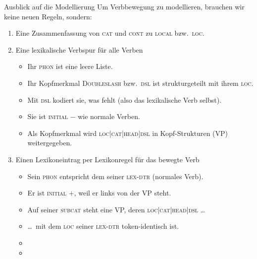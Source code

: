 \begin{frame}
  {Ausblick auf die Modellierung}
  \onslide<+->
  Um \alert{Verbbewegung} zu modellieren, brauchen wir keine neuen Regeln, sondern:\\
  \Halbzeile
  \begin{enumerate}[<+->]
    \item Eine Zusammenfassung von \textsc{cat} und \textsc{cont} zu \alert{\textsc{local}} bzw.\ \alert{\textsc{loc}}.
    \Viertelzeile
    \item Eine \alert{lexikalische Verbspur} für alle Verben
      \begin{itemize}[<+->]
        \item Ihr \textsc{phon} ist eine leere Liste.
        \item Ihr Kopfmerkmal \textsc{Doubleslash} bzw.\ \alert{\textsc{dsl} ist strukturgeteilt mit ihrem \textsc{loc}}.
        \item Mit \textsc{dsl} kodiert sie, was fehlt (also das lexikalische Verb selbst).
        \item Sie ist \textsc{initial $-$} wie normale Verben.
        \item Als Kopfmerkmal wird \textsc{loc|cat|head|dsl} in Kopf-Strukturen (VP) weitergegeben.
      \end{itemize}
      \Viertelzeile
    \item Einen Lexikoneintrag per \alert{Lexikonregel für das bewegte Verb}
      \begin{itemize}[<+->]
        \item Sein \textsc{phon} entspricht dem seiner \textsc{lex-dtr} (normales Verb).
        \item Er ist \textsc{initial $+$}, weil er links von der VP steht.
        \item Auf seiner \textsc{subcat} steht eine VP, deren \textsc{loc|cat|head|dsl} \ldots
        \item \ldots\ mit dem \textsc{loc} seiner \textsc{lex-dtr} token-identisch ist.
        \item {}
        \item {}
      \end{itemize}
  \end{enumerate}
\end{frame}

